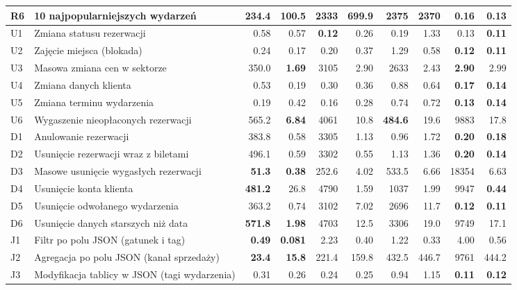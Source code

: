 \begin{tabular}{llrrrrrrrr}
R6 & 10 najpopularniejszych wydarzeń & \num{234.4} & \num{100.5} & \num{2333} & \num{699.9} & \num{2375} & \num{2370} & \textbf{\num{0.16}} & \textbf{\num{0.13}} \\
\midrule
U1 & Zmiana statusu rezerwacji & \num{0.58} & \num{0.57} & \textbf{\num{0.12}} & \num{0.26} & \num{0.19} & \num{1.33} & \num{0.13} & \textbf{\num{0.11}} \\
U2 & Zajęcie miejsca (blokada) & \num{0.24} & \num{0.17} & \num{0.20} & \num{0.37} & \num{1.29} & \num{0.58} & \textbf{\num{0.12}} & \textbf{\num{0.11}} \\
U3 & Masowa zmiana cen w sektorze & \num{350.0} & \textbf{\num{1.69}} & \num{3105} & \num{2.90} & \num{2633} & \num{2.43} & \textbf{\num{2.90}} & \num{2.99} \\
U4 & Zmiana danych klienta & \num{0.53} & \num{0.19} & \num{0.30} & \num{0.36} & \num{0.88} & \num{0.64} & \textbf{\num{0.17}} & \textbf{\num{0.14}} \\
U5 & Zmiana terminu wydarzenia & \num{0.19} & \num{0.42} & \num{0.16} & \num{0.28} & \num{0.74} & \num{0.72} & \textbf{\num{0.13}} & \textbf{\num{0.14}} \\
U6 & Wygaszenie nieopłaconych rezerwacji & \num{565.2} & \textbf{\num{6.84}} & \num{4061} & \num{10.8} & \textbf{\num{484.6}} & \num{19.6} & \num{9883} & \num{17.8} \\
\midrule
D1 & Anulowanie rezerwacji & \num{383.8} & \num{0.58} & \num{3305} & \num{1.13} & \num{0.96} & \num{1.72} & \textbf{\num{0.20}} & \textbf{\num{0.18}} \\
D2 & Usunięcie rezerwacji wraz z biletami & \num{496.1} & \num{0.59} & \num{3302} & \num{0.55} & \num{1.13} & \num{1.36} & \textbf{\num{0.20}} & \textbf{\num{0.14}} \\
D3 & Masowe usunięcie wygasłych rezerwacji & \textbf{\num{51.3}} & \textbf{\num{0.38}} & \num{252.6} & \num{4.02} & \num{533.5} & \num{6.66} & \num{18354} & \num{6.63} \\
D4 & Usunięcie konta klienta & \textbf{\num{481.2}} & \num{26.8} & \num{4790} & \num{1.59} & \num{1037} & \num{1.99} & \num{9947} & \textbf{\num{0.44}} \\
D5 & Usunięcie odwołanego wydarzenia & \num{363.2} & \num{0.74} & \num{3102} & \num{7.02} & \num{2696} & \num{11.7} & \textbf{\num{0.12}} & \textbf{\num{0.11}} \\
D6 & Usunięcie danych starszych niż data & \textbf{\num{571.8}} & \textbf{\num{1.98}} & \num{4703} & \num{12.5} & \num{3306} & \num{19.0} & \num{9749} & \num{17.1} \\
\midrule
J1 & Filtr po polu JSON (gatunek i tag) & \textbf{\num{0.49}} & \textbf{\num{0.081}} & \num{2.23} & \num{0.40} & \num{1.22} & \num{0.33} & \num{4.00} & \num{0.56} \\
J2 & Agregacja po polu JSON (kanał sprzedaży) & \textbf{\num{23.4}} & \textbf{\num{15.8}} & \num{221.4} & \num{159.8} & \num{432.5} & \num{446.7} & \num{9761} & \num{444.2} \\
J3 & Modyfikacja tablicy w JSON (tagi wydarzenia) & \num{0.31} & \num{0.26} & \num{0.24} & \num{0.25} & \num{0.94} & \num{1.15} & \textbf{\num{0.11}} & \textbf{\num{0.12}} \\
\bottomrule
\end{tabular}
